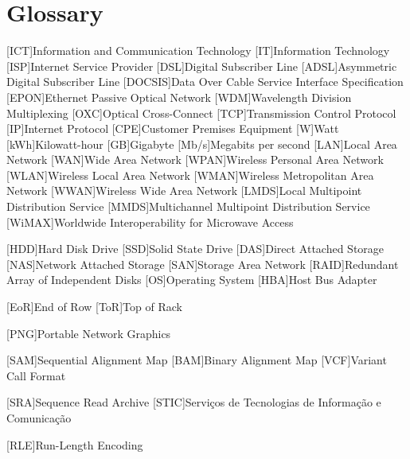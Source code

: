 \chapter{Glossary}

\footnotesize
\SingleSpacing

\begin{multicols}{2}
\begin{acronym}[AAAAAA]


	[ICT]{Information and Communication Technology}
	[IT]{Information Technology}
	[ISP]{Internet Service Provider}
	[DSL]{Digital Subscriber Line}
	[ADSL]{Asymmetric Digital Subscriber Line}
	[DOCSIS]{Data Over Cable Service Interface Specification}
	[EPON]{Ethernet Passive Optical Network}
	[WDM]{Wavelength Division Multiplexing}
	[OXC]{Optical Cross-Connect}
	[TCP]{Transmission Control Protocol}
	[IP]{Internet Protocol}
	[CPE]{Customer Premises Equipment}
	{Watt}
	[kWh]{Kilowatt-hour}
	[GB]{Gigabyte}
	[Mb/s]{Megabits per second}
	[LAN]{Local Area Network}
	[WAN]{Wide Area Network}
	[WPAN]{Wireless Personal Area Network}
	[WLAN]{Wireless Local Area Network}
	[WMAN]{Wireless Metropolitan Area Network}
	[WWAN]{Wireless Wide Area Network}
	[LMDS]{Local Multipoint Distribution Service}
	[MMDS]{Multichannel Multipoint Distribution Service}
	[WiMAX]{Worldwide Interoperability for Microwave Access}

	[HDD]{Hard Disk Drive}
	[SSD]{Solid State Drive}
	[DAS]{Direct Attached Storage}
	[NAS]{Network Attached Storage}
	[SAN]{Storage Area Network}
	[RAID]{Redundant Array of Independent Disks}
	[OS]{Operating System}
	[HBA]{Host Bus Adapter}

	[EoR]{End of Row}
	[ToR]{Top of Rack}

	[PNG]{Portable Network Graphics}

	[SAM]{Sequential Alignment Map}
	[BAM]{Binary Alignment Map}
	[VCF]{Variant Call Format}

	[SRA]{Sequence Read Archive}
	[STIC]{Serviços de Tecnologias de Informação e Comunicação}

	[RLE]{Run-Length Encoding}

\end{acronym}
\end{multicols}

